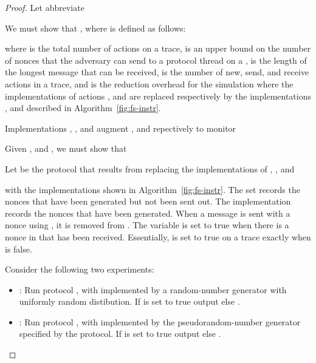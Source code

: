 \begin{proof}
Let  abbreviate

We must show that , where  is defined as follows:

where  is the total number of  actions on a trace,  is an upper bound on the number of nonces that the adversary can
send to a protocol thread on a ,  is the length of the
longest message that can be received,  is the number of new, send, and receive actions in
a trace, and  is the reduction overhead for the simulation where the
implementations of actions ,  and  are
replaced respectively by the implementations ,   and
 described in Algorithm~\ref{fig:fs-instr}.

\begin{algorithm2e}
    \myalg{\inew{}}{
      \nl  \new{}\;
      \nl \KwRet{}\;}{}
    \setcounter{AlgoLine}{0}
    \myalg{\isend{}}{
      \nl  \send{}\;
      \nl \KwRet{}\;}{}
    \setcounter{AlgoLine}{0}
    \myalg{\irecv{}}{
      \nl  \recv{}\;
      \nl \lIf{}{}
      \nl \KwRet{}\;}{}
      \caption{Implementations , , and  augment ,  and  repectively to monitor }
  \label{fig:fs-instr}
  \end{algorithm2e}

Given , and , we must show that

Let  be the protocol that results from replacing
the implementations of , , and

with the implementations shown in Algorithm~\ref{fig:fs-instr}.
The
set  records the
nonces that have been generated but not been sent out. The implementation
 records the nonces that have been generated. When
a message is sent with a nonce using , it is
removed from .
The variable  is set to true when there is a nonce in  that has been received.
Essentially,  is set to true on a trace exactly when  is false.

Consider the
following two experiments:
\begin{itemize}
\item : Run protocol , with  implemented
by a random-number generator with uniformly random distibution. If
 is set to true output  else .
\item : Run protocol , with  implemented
by the pseudorandom-number generator  specified by the
protocol. If  is set to true output  else
.
\end{itemize}


\end{proof}
